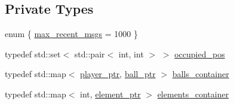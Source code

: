 \subsection*{Private Types}
\begin{DoxyCompactItemize}
\item 
enum \{ \hyperlink{classwebsocket_1_1GameBoard_a84b7265b5db0109546eeadc332b10254a1a669a5c5c208eebeb228bd6cbe3611b}{max\+\_\+recent\+\_\+msgs} = 1000
 \}
\item 
typedef std\+::set$<$ std\+::pair$<$ int, int $>$ $>$ \hyperlink{classwebsocket_1_1GameBoard_ab68a03a083cfa75e7d5b21fe0c13eda3}{occupied\+\_\+pos}
\item 
typedef std\+::map$<$ \hyperlink{namespacewebsocket_aec8d52893bdf524a1412533a63b006a3}{player\+\_\+ptr}, \hyperlink{namespacewebsocket_aae1d9cf317a0fb0b83bdfc2f92df77c7}{ball\+\_\+ptr} $>$ \hyperlink{classwebsocket_1_1GameBoard_a49ec88dacda0efb3448649503967e07d}{balls\+\_\+container}
\item 
typedef std\+::map$<$ int, \hyperlink{namespacewebsocket_a1f36ba91b301b228fa9e9f812883050c}{element\+\_\+ptr} $>$ \hyperlink{classwebsocket_1_1GameBoard_a6340e99ab84e0fc9ee504f5874073c0c}{elements\+\_\+container}
\end{DoxyCompactItemize}
